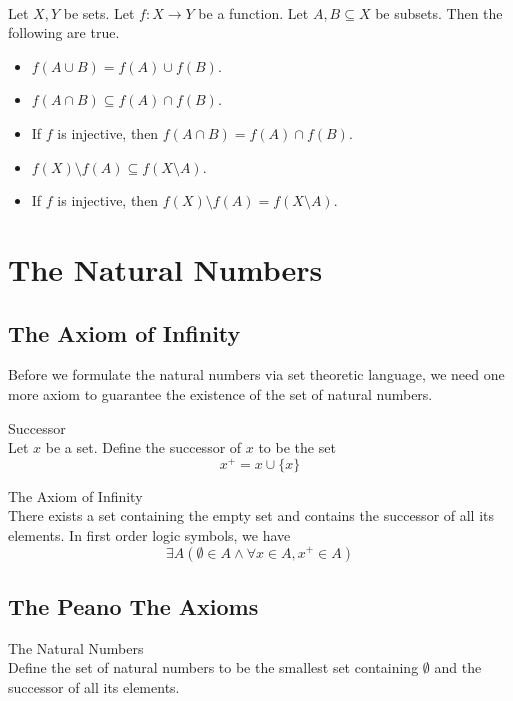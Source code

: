 \documentclass[a4paper]{article}
\begin{document}
\begin{prp}{}{}\\
Let $X,Y$ be sets. Let $f:X\to Y$ be a function. Let $A,B\subseteq X$ be subsets. Then the following are true. 
\begin{itemize}
\item $f(A\cup B)=f(A)\cup f(B)$. 
\item $f(A\cap B)\subseteq f(A)\cap f(B)$. 
\item If $f$ is injective, then $f(A\cap B)=f(A)\cap f(B)$. 
\item $f(X)\setminus f(A)\subseteq f(X\setminus A)$. 
\item If $f$ is injective, then $f(X)\setminus f(A)=f(X\setminus A)$. 
\end{itemize} 
\end{prp}

\pagebreak
\section{The Natural Numbers}
\subsection{The Axiom of Infinity}
Before we formulate the natural numbers via set theoretic language, we need one more axiom to guarantee the existence of the set of natural numbers. 

\begin{defn}{Successor}{}\\
Let $x$ be a set. Define the successor of $x$ to be the set $$x^+=x\cup\{x\}$$
\end{defn}

\begin{axm}{The Axiom of Infinity}{}\\
There exists a set containing the empty set and contains the successor of all its elements. In first order logic symbols, we have $$\exists A(\emptyset\in A\wedge\forall x\in A,x^+\in A)$$
\end{axm}

\subsection{The Peano The Axioms}
\begin{defn}{The Natural Numbers}{}\\
Define the set of natural numbers to be the smallest set containing $\emptyset$ and the successor of all its elements. 
\end{defn}
\end{document}
